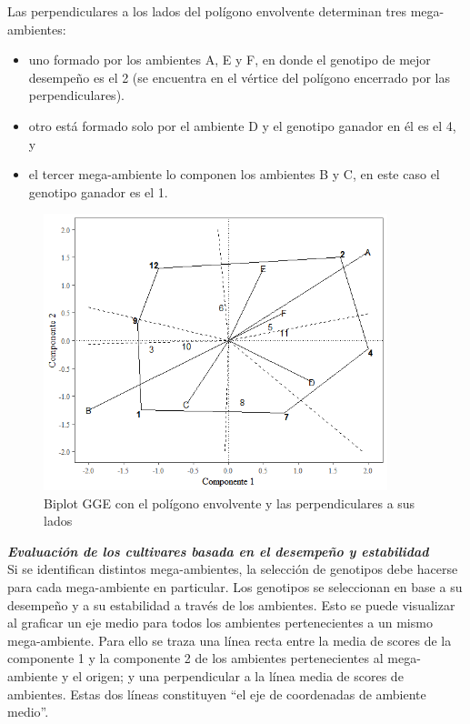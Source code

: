 Las perpendiculares a los lados del polígono envolvente determinan tres mega-ambientes:
\begin{itemize}
\item uno formado por los ambientes A, E y F, en donde el genotipo de mejor desempeño es el 2 (se
encuentra en el vértice del polígono encerrado por las perpendiculares).
\item otro está formado solo por el ambiente D y el genotipo ganador en él es el 4, y
\item  el tercer mega-ambiente lo componen los ambientes B y C, en este caso el genotipo ganador es el 1.
\end{itemize}


\begin{figure}[H]
	\begin{center}
		\includegraphics[width=10cm]{./Graficos/poligono_GGE.png}
	\end{center}
	\caption{Biplot GGE con el polígono envolvente y las perpendiculares a sus lados}
	\label{fig:fig315}
\end{figure}




\textbf{\emph{Evaluación de los cultivares basada en el desempeño y estabilidad}}\\

Si se identifican distintos mega-ambientes, la selección de genotipos debe hacerse para cada mega-ambiente en particular. Los genotipos se seleccionan en base a su desempeño y a su estabilidad a través de los ambientes. Esto se puede visualizar al graficar un eje medio para todos los ambientes pertenecientes a un mismo mega-ambiente. Para ello se traza una línea recta entre la media de scores de la componente 1 y la componente 2 de los ambientes pertenecientes al mega-ambiente y el origen; y una perpendicular a la línea media de scores de ambientes. Estas dos líneas constituyen ``el eje de coordenadas de ambiente medio''.

